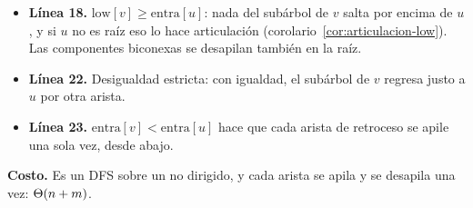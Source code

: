 \documentclass[11pt,letterpaper]{article}
\begin{document}
\begin{itemize}[itemsep=0.1em]
  \item \textbf{Línea 18.} $\text{low}[v] \ge \text{entra}[u]$: nada
        del subárbol de $v$ salta por encima de $u$, y si $u$ no es
        raíz eso lo hace articulación
        (corolario~\ref{cor:articulacion-low}). Las componentes
        biconexas se desapilan también en la raíz.
  \item \textbf{Línea 22.} Desigualdad estricta: con igualdad, el
        subárbol de $v$ regresa justo a $u$ por otra arista.
  \item \textbf{Línea 23.} $\text{entra}[v] < \text{entra}[u]$ hace que
        cada arista de retroceso se apile una sola vez, desde abajo.
\end{itemize}

\textbf{Costo.} Es un DFS sobre un no dirigido, y cada arista se apila
y se desapila una vez: $\Theta\!\left(n + m\right)$.
\end{document}
